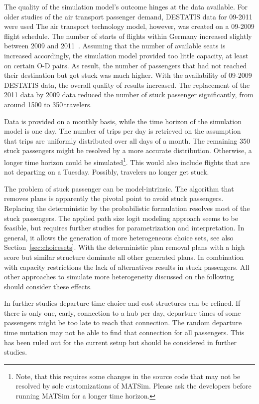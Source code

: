 The quality of the simulation model's outcome hinges at the data available.  
For older studies of the air transport passenger demand, DESTATIS data for 09-2011 were used 
The air transport technology model, however, was created on a 09-2009 flight schedule.  
The number of starts of flights within Germany increased slightly between 2009 and 2011~\citep[][p.~23]{DLR2011Luftverkehrsbericht}. 
Assuming that the number of available seats is increased accordingly, the simulation model provided too little capacity, at least on certain O-D pairs. 
As result, the number of passengers that had not reached their destination but got stuck was much higher.  
With the availability of 09-2009 DESTATIS data, the overall quality of results increased.  
The replacement of the 2011 data by 2009 data reduced the number of stuck passenger significantly, from around 1500 to 350\,travelers. 

Data is provided on a monthly basis, while the time horizon of the simulation model is one day. 
The number of trips per day is retrieved on the assumption that trips are uniformly distributed over all days of a month.  
The remaining 350\,stuck passengers might be resolved by a more accurate distribution. 
Otherwise, a longer time horizon could be simulated\footnote{Note, that this requires some changes in the source code that may not be resolved by sole customizations of MATSim. Please ask the developers before running MATSim for a longer time horizon.}. 
This would also include flights that are not departing on a Tuesday. 
Possibly, travelers no longer get stuck. 

The problem of stuck passenger can be model-intrinsic. 
The algorithm that removes plans is apparently the pivotal point to avoid stuck passengers. 
Replacing the deterministic by the probabilistic formulation resolves most of the stuck passengers. 
The applied path size logit modeling approach seems to be feasible, but requires further studies for parametrization and interpretation. 
In general, it allows the generation of more heterogeneous choice sets, see also Section~\ref{sec:choicesets}. 
With the deterministic plan removal plans with a high score but similar structure dominate all other generated plans. 
In combination with capacity restrictions the lack of alternatives results in stuck passengers.  
All other approaches to simulate more heterogeneity discussed on the following should consider these effects.  

In further studies departure time choice and cost structures can be refined. 
If there is only one, early, connection to a hub per day, departure times of some passengers might be too late to reach that connection. 
The random departure time mutation may not be able to find that connection for all passengers. 
This has been ruled out for the current setup but should be considered in further studies. 


